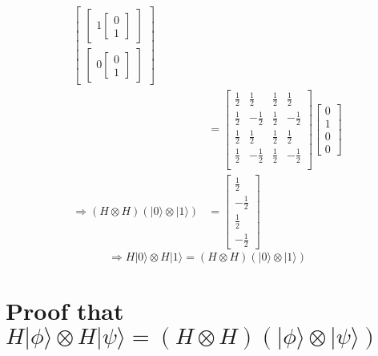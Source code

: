 \documentclass{article}
\begin{document}
\begin{equation}
\begin{split}
\begin{bmatrix}
\begin{bmatrix}
            1\begin{bmatrix}
                0 \\
                1
            \end{bmatrix}
        \end{bmatrix}\\
        \begin{bmatrix}
            0\begin{bmatrix}
                0 \\
                1
            \end{bmatrix}
        \end{bmatrix}
    \end{bmatrix} \\
    & = \begin{bmatrix}
        \frac{1}{2} & \frac{1}{2} & \frac{1}{2} & \frac{1}{2} \\
        \frac{1}{2} & -\frac{1}{2} & \frac{1}{2} & -\frac{1}{2} \\
        \frac{1}{2} & \frac{1}{2} & \frac{1}{2} & \frac{1}{2} \\
        \frac{1}{2} & -\frac{1}{2} & \frac{1}{2} & -\frac{1}{2} \\
    \end{bmatrix} \begin{bmatrix}
        0 \\
        1 \\
        0 \\
        0
    \end{bmatrix} \\
    \Longrightarrow (H \otimes H)(|0\rangle \otimes |1\rangle) & = \begin{bmatrix}
        \frac{1}{2} \\
        -\frac{1}{2} \\
        \frac{1}{2} \\
        -\frac{1}{2}
    \end{bmatrix}
\end{split}
\end{equation}
\begin{equation}
    \Longrightarrow H|0\rangle \otimes H|1\rangle = (H \otimes H)(|0\rangle \otimes |1\rangle)
\end{equation}

\section{Proof that $H|\phi\rangle \otimes H|\psi\rangle = (H \otimes H)(|\phi\rangle \otimes |\psi\rangle)$}
\end{document}
